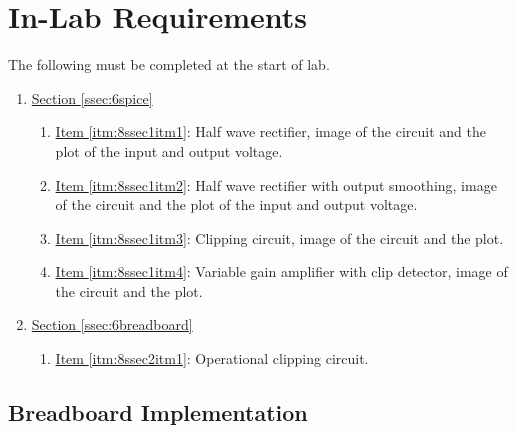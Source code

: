 \section{In-Lab Requirements}

The following must be completed at the start of lab. 

\begin{enumerate}
	\item \hyperref[ssec:6spice]{Section \ref*{ssec:6spice}}
		\begin{enumerate}
			\item \hyperref[itm:8ssec1itm1]{Item \ref*{itm:8ssec1itm1}}: Half wave rectifier, image of the circuit and the plot of the input and output voltage.
			\item \hyperref[itm:8ssec1itm2]{Item \ref*{itm:8ssec1itm2}}: Half wave rectifier with output smoothing, image of the circuit and the plot of the input and output voltage.
			\item \hyperref[itm:8ssec1itm3]{Item \ref*{itm:8ssec1itm3}}: Clipping circuit, image of the circuit and the plot.
			\item \hyperref[itm:8ssec1itm4]{Item \ref*{itm:8ssec1itm4}}: Variable gain amplifier with clip detector, image of the circuit and the plot.
		\end{enumerate}
	\item \hyperref[ssec:6breadboard]{Section \ref*{ssec:6breadboard}}
		\begin{enumerate}
			\item \hyperref[itm:8ssec1itm5]{Item \ref*{itm:8ssec2itm1}}: Operational clipping circuit. 
		\end{enumerate}
\end{enumerate}

\subsection{Breadboard Implementation}

